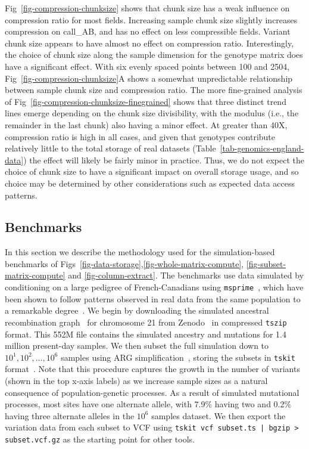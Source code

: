 \documentclass[a4paper,num-refs]{oup-contemporary}
\begin{document}
Fig~\ref{fig-compression-chunksize} shows that chunk size has a
weak influence on compression ratio for most fields.
Increasing sample chunk size slightly increases
compression on call\_AB, and has no effect on less compressible
fields. Variant chunk size appears to have almost no effect
on compression ratio.
Interestingly, the choice of chunk size along the sample dimension for the
genotype matrix does have a significant effect.
With six evenly spaced points between 100 and 2504,
Fig~\ref{fig-compression-chunksize}A shows a somewhat unpredictable
relationship between sample chunk size and compression ratio.
The more fine-grained analysis of
Fig~\ref{fig-compression-chunksize-finegrained} shows that three
distinct trend lines emerge depending on the chunk size
divisibility, with the modulus
(i.e., the remainder in the last chunk) also having a minor effect.
At greater than 40X,
compression ratio is
high in all cases, and given that genotypes contribute relatively
little to the total storage of real datasets
(Table~\ref{tab-genomics-england-data}) the effect will
likely be fairly minor in practice.
Thus, we do not expect the choice of chunk size to have a significant
impact on overall storage usage, and so choice may be
determined by other considerations such as expected data
access patterns.

\subsection{Benchmarks}
In this section we describe the methodology used for the simulation-based
benchmarks of Figs~\ref{fig-data-storage},\ref{fig-whole-matrix-compute},
\ref{fig-subset-matrix-compute} and \ref{fig-column-extract}.
The benchmarks use data simulated by conditioning on a large
pedigree of French-Canadians using
\texttt{msprime}~\citep{baumdicker2021efficient},
which have been shown to follow patterns observed in real
data from the same population to a remarkable
degree~\cite{anderson2023on}.
We begin by downloading the simulated ancestral recombination
graph~\cite{brandt2024promise,lewanski2024era,wong2024general}
for chromosome 21 from Zenodo~\cite{anderson2023simulated}
in compressed \texttt{tszip} format. This 552M file
contains the simulated ancestry and mutations for 1.4 million
present-day samples. We then subset the full simulation
down to ${10^1, 10^2, \dots, 10^6}$ samples using
ARG simplification~\cite{kelleher2018efficient,wong2024general},
storing the subsets in \texttt{tskit} format~\cite{ralph2020efficiently,tskit2024}.
Note that this procedure captures the growth
in the number of variants (shown in the top x-axis labels)
as we increase sample sizes as a
natural consequence of population-genetic processes.
As a result of simulated mutational processes,
most sites have one alternate allele,
with 7.9\% having two and 0.2\% having three
alternate alleles in the $10^6$ samples dataset.
We then export the variation data from each subset to VCF
using \texttt{tskit vcf subset.ts | bgzip > subset.vcf.gz}
as the starting point for other tools.
\end{document}
